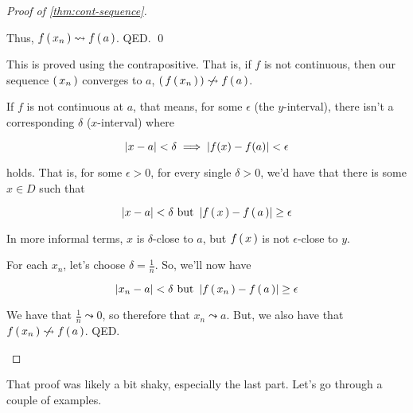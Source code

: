 \begin{proof}[Proof of \cref{thm:cont-sequence}]
\begin{description}
    Thus, $f \left(\, x_n \,\right) \leadsto f \left(\, a \,\right)$. QED. \qed
  \item[Proof of the ``if'' part] This is proved using the contrapositive. That
    is, if $f$ is not continuous, then our sequence $\left(\, x_n \,\right)$ converges to
    $a$,  $\mlist{\eva{f}{x_n}} \centernot\leadsto \eva{f}{a}$.

    If $f$ is not continuous at $a$, that means, for some $\epsilon$ (the
    $y$-interval), there isn't a corresponding $\delta$ ($x$-interval) where

    \begin{equation}
      \label{eq:contdef}
      \left| x - a \right| < \delta \implies \left| f(x) - f(a) \right| < \epsilon
    \end{equation}

    holds. That is, for some $\epsilon > 0$, for every single $\delta > 0$, we'd
    have that there is some $x \in D$ such that

    \begin{equation}
      \left| x - a \right| < \delta \text{ but } \left| f \left(\, x \,\right) - f \left(\, a \,\right) \right| \ge \epsilon
    \end{equation}

    In more informal terms, $x$ is $\delta$-close to $a$, but $f \left(\, x \,\right)$ is
    not $\epsilon$-close to $y$.

    For each $x_n$, let's choose $\delta = \frac{1}{n}$. So, we'll now have

    \begin{equation}
      \left| x_n - a \right| < \delta \text{ but } \left| f \left(\, x_n \,\right) - f \left(\, a \,\right) \right| \ge \epsilon
    \end{equation}

    We have that $\frac{1}{n} \leadsto 0$, so therefore that $x_n \leadsto a$.
    But, we also have that $\eva{f}{x_n} \centernot\leadsto \eva{f}{a}$. QED.
  \end{description}
\end{proof}

That proof was likely a bit shaky, especially the last part. Let's go through a
couple of examples.

